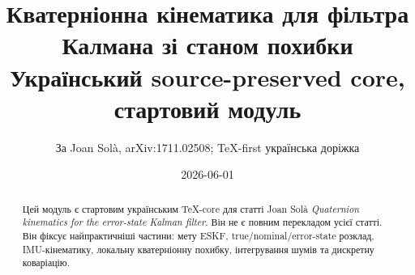 \documentclass[11pt,a4paper]{article}
\title{Кватерніонна кінематика для фільтра Калмана зі станом похибки\\\large Український source-preserved core, стартовий модуль}
\author{За Joan Sol\`a, arXiv:1711.02508; TeX-first українська доріжка}
\date{2026-06-01}
\begin{document}
\maketitle
\begin{abstract}
Цей модуль є стартовим українським TeX-core для статті Joan Sol\`a \emph{Quaternion kinematics for the error-state Kalman filter}. Він не є повним перекладом усієї статті. Він фіксує найпрактичніші частини: мету ESKF, true/nominal/error-state розклад, IMU-кінематику, локальну кватерніонну похибку, інтегрування шумів та дискретну коваріацію.
\end{abstract}
\tableofcontents






\end{document}
